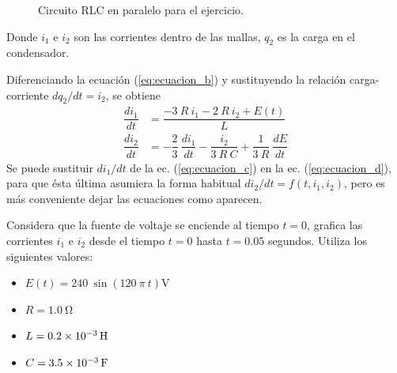 \documentclass[11pt]{article}
\begin{document}
\begin{enumerate}
\begin{figure}[H]
	\caption{Circuito RLC en paralelo para el ejercicio.}
\end{figure}
Donde $i_{1}$ e $i_{2}$ son las corrientes dentro de las mallas, $q_{2}$ es la carga en el condensador.
\par
Diferenciando la ecuación (\ref{eq:ecuacion_b}) y sustituyendo la relación carga-corriente $d q_{2}/ dt = i_{2}$, se obtiene
\begin{align}
\dfrac{d i_{1}}{dt} &= \dfrac{-3 \: R \: i_{1} - 2 \: R \: i_{2} +  E(t)}{L} \label{eq:ecuacion_c} \\
\dfrac{d i_{2}}{dt} &= - \dfrac{2}{3} \: \dfrac{d i_{1}}{dt} - \dfrac{i_{2}}{3 \: R \: C} + \dfrac{1}{3 \: R} \: \dfrac{d E}{dt} \label{eq:ecuacion_d}
\end{align}
Se puede sustituir $d i_{1} / dt$ de la ec. (\ref{eq:ecuacion_c}) en la ec. (\ref{eq:ecuacion_d}), para que ésta última asumiera la forma habitual $d i_{2} / dt =  f(t, i_{1}, i_{2})$, pero es más conveniente dejar las ecuaciones como aparecen.
\par
Considera que la fuente de voltaje se enciende al tiempo $t = 0$, grafica las corrientes $i_{1}$ e $i_{2}$ desde el tiempo $t = 0$ hasta $t = 0.05$ segundos. Utiliza los siguientes valores:
\begin{itemize}
\item $E(t) = 240 \: \sin (120 \: \pi \: t) \si\volt$
\item $R = \SI{1.0}{\ohm}$
\item $L = \SI{0.2d-3}{\henry}$
\item $C = \SI{3.5d-3}{\farad}$
\end{itemize}
\end{enumerate}
\end{document}
